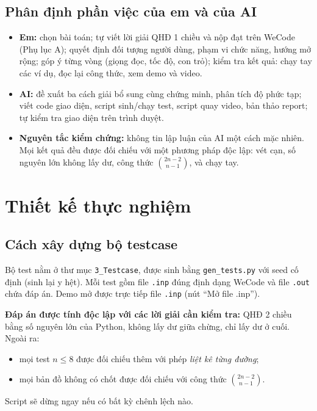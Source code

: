 \documentclass[12pt,a4paper]{report}
\begin{document}
\section{Phân định phần việc của em và của AI}
\begin{itemize}
  \item \textbf{Em:} chọn bài toán; tự viết lời giải QHĐ 1 chiều và nộp đạt trên WeCode (Phụ lục A); quyết định đối tượng người dùng, phạm vi chức năng, hướng mở rộng; góp ý từng vòng (giọng đọc, tốc độ, con trỏ); kiểm tra kết quả: chạy tay các ví dụ, đọc lại công thức, xem demo và video.
  \item \textbf{AI:} đề xuất ba cách giải bổ sung cùng chứng minh, phân tích độ phức tạp; viết code giao diện, script sinh/chạy test, script quay video, bản thảo report; tự kiểm tra giao diện trên trình duyệt.
  \item \textbf{Nguyên tắc kiểm chứng:} không tin lập luận của AI một cách mặc nhiên. Mọi kết quả đều được đối chiếu với một phương pháp độc lập: vét cạn, số nguyên lớn không lấy dư, công thức $\binom{2n-2}{n-1}$, và chạy tay.
\end{itemize}

\chapter{Thiết kế thực nghiệm}
\section{Cách xây dựng bộ testcase}
Bộ test nằm ở thư mục \texttt{3\_Testcase}, được sinh bằng \texttt{gen\_tests.py} với seed cố định (sinh lại y hệt). Mỗi test gồm file \texttt{.inp} đúng định dạng WeCode và file \texttt{.out} chứa đáp án. Demo mở được trực tiếp file \texttt{.inp} (nút ``Mở file .inp'').

\textbf{Đáp án được tính độc lập với các lời giải cần kiểm tra:} QHĐ 2 chiều bằng số nguyên lớn của Python, không lấy dư giữa chừng, chỉ lấy dư ở cuối. Ngoài ra:
\begin{itemize}
  \item mọi test $n\le 8$ được đối chiếu thêm với phép \emph{liệt kê từng đường};
  \item mọi bản đồ không có chốt được đối chiếu với công thức $\binom{2n-2}{n-1}$.
\end{itemize}
Script sẽ dừng ngay nếu có bất kỳ chênh lệch nào.
\end{document}
